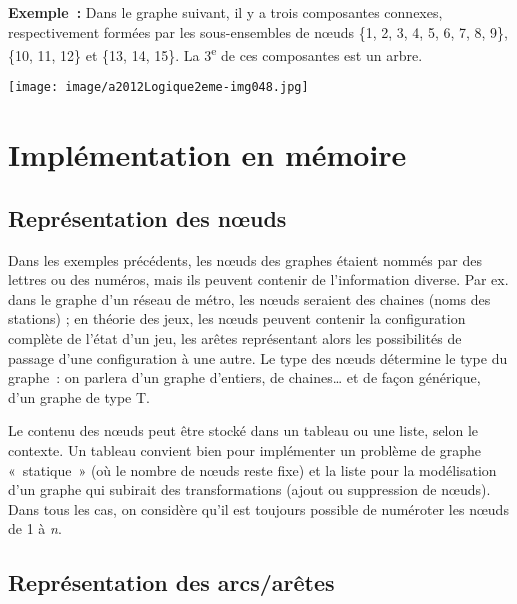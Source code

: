 		\textbf{Exemple~:} Dans le graphe suivant, il y a trois composantes 
		connexes, respectivement formées par les sous-ensembles de n{\oe}uds 
		\{1, 2, 3, 4, 5, 6, 7, 8, 9\}, \{10, 11, 12\} et \{13, 14, 15\}. 
		La 3\textsuperscript{e} de ces composantes est un arbre.

		\begin{center}
		\texttt{[image: image/a2012Logique2eme-img048.jpg]}
		\end{center}



\section{Implémentation en mémoire}

	\subsection{Représentation des n{\oe}uds}
				
		Dans les exemples précédents, les n{\oe}uds des graphes étaient 
		nommés par des lettres ou des numéros, mais ils peuvent
		contenir de l'information diverse. Par ex. dans le graphe 
		d'un réseau de métro, les n{\oe}uds seraient des chaines
		(noms des stations) ; en théorie des jeux, les n{\oe}uds 
		peuvent contenir la configuration complète de l'état d'un jeu,
		les arêtes représentant alors les possibilités de passage 
		d'une configuration à une autre. Le type des n{\oe}uds
		détermine le type du graphe~: on parlera d'un graphe d'entiers, 
		de chaines{\dots} et de façon générique, d'un graphe de type T.

		Le contenu des n{\oe}uds peut être stocké dans un tableau ou une 
		liste, selon le contexte. Un tableau convient bien pour
		implémenter un problème de graphe «~statique~» (où le nombre 
		de n{\oe}uds reste fixe) et la liste pour la modélisation
		d'un graphe qui subirait des transformations (ajout ou 
		suppression de n{\oe}uds). Dans tous les cas, on considère qu'il
		est toujours possible de numéroter les n{\oe}uds de 1 à \textit{n}.

	\subsection{Représentation des arcs/arêtes}
				
